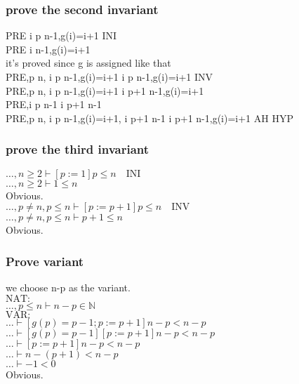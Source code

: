 \documentclass[11pt,a4paper,fleqn]{article}
\begin{document}
\subsubsection{prove the second invariant}
\noindent
PRE \vdash [g:=( \{0\} \domsub f)\cup \{n-1 \mapsto n\},p:=1]\forall i \in p \upto n-1,g(i)=i+1  \;INI \\
PRE \vdash [g:=( \{0\} \domsub f)\cup \{n-1 \mapsto n\}]\forall i  \upto n-1,g(i)=i+1 \\
it's \; proved \; since \; g \; is \; assigned \; like \; that \\
PRE,p \neq n, \forall i \in p \upto n-1,g(i)=i+1 \vdash [g(p):=p-1,p:=p+1]\forall i \in p \upto n-1,g(i)=i+1 \; INV \\
PRE,p \neq n, \forall i \in p \upto n-1,g(i)=i+1 \vdash [g(p):=p-1]\forall i \in p+1 \upto n-1,g(i)=i+1 \\
PRE,\forall i \in p \upto n-1 \vdash i \in p+1 \upto n-1 \\
PRE,p \neq n, \forall i \in p \upto n-1,g(i)=i+1, \forall i \in p+1 \upto n-1 \vdash [g(p):=p-1]\forall i \in p+1 \upto n-1,g(i)=i+1 \;AH \;HYP \\
\subsubsection{prove the third invariant}
\noindent
$\ldots,n\geq 2\vdash [p:=1]p\leq n\quad\text{INI}$\\
$\ldots,n\geq 2\vdash 1\leq n$\\
Obvious.\\
$\ldots,p\not=n,p\leq n\vdash [p:=p+1]p\leq n\quad\text{INV}$\\
$\ldots,p\not=n,p\leq n\vdash p+1\leq n$\\
Obvious.\\
\subsubsection{Prove variant}
\noindent
we choose n-p as the variant.\\
$\text{NAT:}$\\
$ \ldots,p\leq n\vdash n-p\in\mathbb{N}$\\
$\text{VAR:}$\\
$ \ldots\vdash [g(p)=p-1;p:=p+1]n-p<n-p$\\
$ \ldots\vdash [g(p)=p-1][p:=p+1]n-p<n-p$\\
$ \ldots\vdash [p:=p+1]n-p<n-p$\\
$ \ldots\vdash n-(p+1)<n-p$\\
$ \ldots\vdash -1<0$\\
Obvious.
\end{document}

